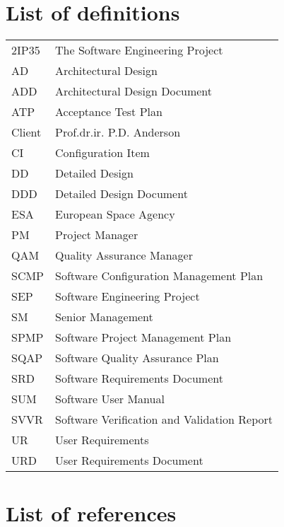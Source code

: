 \section{List of definitions}
\begin{longtable}{l|l}
2IP35 & The Software Engineering Project \\ 
AD    &Architectural Design \\ 
ADD   &Architectural Design Document \\ 
ATP   &Acceptance Test Plan \\ 
Client &Prof.dr.ir. P.D. Anderson \\ 
CI &Configuration Item\\
DD    &Detailed Design \\ 
DDD   &Detailed Design Document \\ 
ESA   &European Space Agency \\ 
PM    &Project Manager \\ 
QAM &Quality Assurance Manager\\
SCMP  &Software Configuration Management Plan \\ 
SEP   &Software Engineering Project \\ 
SM	  &Senior Management \\
SPMP  &Software Project Management Plan \\ 
SQAP  &Software Quality Assurance Plan \\ 
SRD   &Software Requirements Document \\ 
SUM   &Software User Manual \\ 
SVVR  &Software Verification and Validation Report \\ 
UR    &User Requirements \\ 
URD   &User Requirements Document \\ 
\end{longtable}

\section{List of references}



